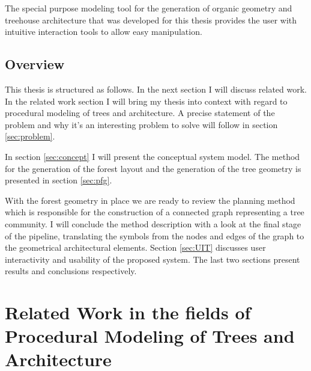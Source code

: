 \documentclass{article}
\newcommand{\old}[1]{\textcolor{myGrey}{\small{\textbf{\newline Old: }\it{#1}}}}
\begin{document}
The special purpose modeling tool for the generation of organic geometry and treehouse architecture that was developed for this thesis provides the user with intuitive interaction tools to allow easy manipulation.        



\subsection{Overview}
\label{subsec:overview}

This thesis is structured as follows. In the next section I will discuss related work. In the related work section I will bring my thesis into context with regard to procedural modeling of trees and architecture. A precise statement of the problem and why it's an interesting problem to solve will follow in section \ref{sec:problem}. 

In section \ref{sec:concept} I will present the conceptual system model. The method for the generation of the forest layout and the generation of the tree geometry is presented in section \ref{sec:pfg}.  
 
With the forest geometry in place we are ready to review the planning method which is responsible for the construction of a connected graph representing a tree community. I will conclude the method description with a look at the final stage of the pipeline, translating the symbols from the nodes and edges of the graph to the geometrical architectural elements. Section \ref{sec:UIT} discusses user interactivity and usability of the proposed system. The last two sections present results and conclusions respectively.     

\section{Related Work in the fields of Procedural Modeling of Trees and Architecture}
\label{sec:relatedwork}
\end{document}
